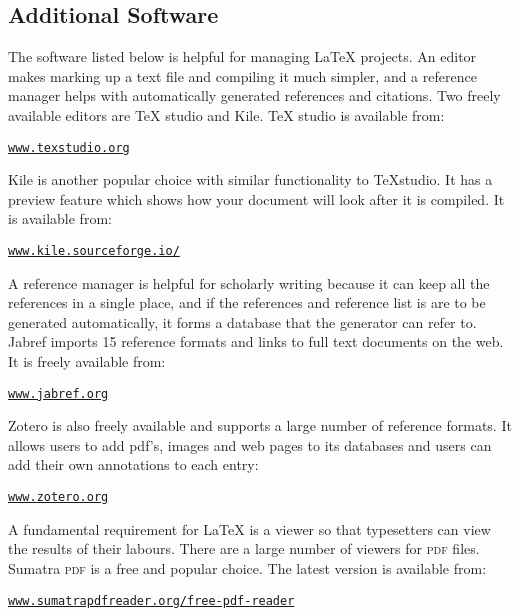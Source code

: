 \documentclass[12pt, a4paper]{article}
\begin{document}
\subsection{Additional Software}

The software listed below is helpful for managing LaTeX projects. An editor makes marking up a text file and compiling it much simpler, and a reference manager helps with automatically generated references and citations. Two freely available editors are TeX studio and Kile. TeX studio is available from: 

\begin{flushleft}
\texttt{\url{www.texstudio.org}}
\end{flushleft}

Kile is another popular choice with similar functionality to TeXstudio. It has a preview feature which shows how your document will look after it is compiled. It is available from:

\begin{flushleft}
\texttt{\url{www.kile.sourceforge.io/}}
\end{flushleft}

A reference manager is helpful for scholarly writing because it can keep all the references in a single place, and if the references and reference list is are to be generated automatically, it forms a database that the generator can refer to. Jabref imports 15 reference formats and links to full text documents on the web. It is freely available from:

\begin{flushleft}
\texttt{\url{www.jabref.org}}
\end{flushleft}

Zotero is also freely available and supports a large number of reference formats. It allows users to add pdf's, images and web pages to its databases and users can add their own annotations to each entry:

\begin{flushleft}
\texttt{\url{www.zotero.org}}
\end{flushleft}


A fundamental requirement for LaTeX is a viewer so that typesetters can view the results of their labours. There are a large number of viewers for \textsc{pdf} files. Sumatra \textsc{pdf} is a free and popular choice. The latest version is available from:


\begin{flushleft}
\texttt{\url{www.sumatrapdfreader.org/free-pdf-reader}}
\end{flushleft}
\end{document}
